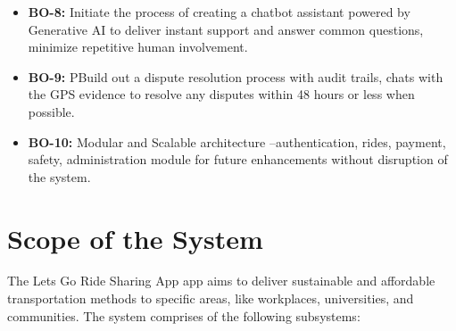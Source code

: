 \begin{itemize}
    \item \textbf{BO-8:} Initiate the process of creating a chatbot assistant powered by Generative AI to deliver instant support and answer common questions, minimize repetitive human involvement.

    \item \textbf{BO-9:} PBuild out a dispute resolution process with audit trails, chats with the GPS evidence to resolve any disputes within 48 hours or less when possible.

    \item \textbf{BO-10:} Modular and Scalable architecture –authentication, rides, payment, safety, administration module for future enhancements without disruption of the system.
\end{itemize}


\section{Scope of the System}

The Lets Go Ride Sharing App app aims to deliver sustainable and affordable transportation methods to specific areas, like workplaces, universities, and communities. The system comprises of the following subsystems:

